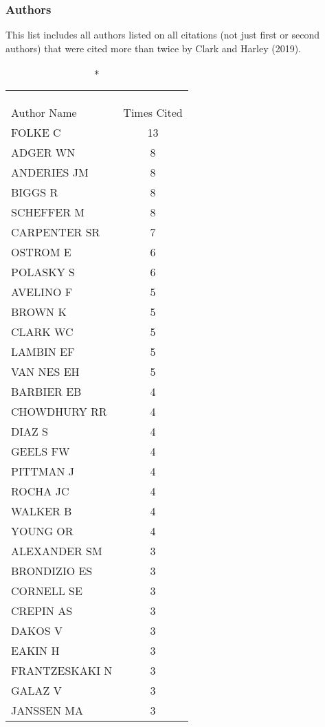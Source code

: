 \documentclass[]{article}
\begin{document}
\hypertarget{authors}{%
\subsubsection{Authors}\label{authors}}

This list includes all authors listed on all citations (not just first
or second authors) that were cited more than twice by Clark and Harley
(2019). \captionsetup[table]{labelformat=empty,skip=1pt}

\begin{longtable}{lc}
\caption*{
\large Most Frequently Cited Authors\textsuperscript{1}\\ 
\small \textsuperscript{}\\ 
} \\ 
\toprule
Author Name & Times Cited \\ 
\midrule
FOLKE C & 13 \\ 
ADGER WN & 8 \\ 
ANDERIES JM & 8 \\ 
BIGGS R & 8 \\ 
SCHEFFER M & 8 \\ 
CARPENTER SR & 7 \\ 
OSTROM E & 6 \\ 
POLASKY S & 6 \\ 
AVELINO F & 5 \\ 
BROWN K & 5 \\ 
CLARK WC & 5 \\ 
LAMBIN EF & 5 \\ 
VAN NES EH & 5 \\ 
BARBIER EB & 4 \\ 
CHOWDHURY RR & 4 \\ 
DIAZ S & 4 \\ 
GEELS FW & 4 \\ 
PITTMAN J & 4 \\ 
ROCHA JC & 4 \\ 
WALKER B & 4 \\ 
YOUNG OR & 4 \\ 
ALEXANDER SM & 3 \\ 
BRONDIZIO ES & 3 \\ 
CORNELL SE & 3 \\ 
CREPIN AS & 3 \\ 
DAKOS V & 3 \\ 
EAKIN H & 3 \\ 
FRANTZESKAKI N & 3 \\ 
GALAZ V & 3 \\ 
JANSSEN MA & 3 \\ 

\end{longtable}
\end{document}
